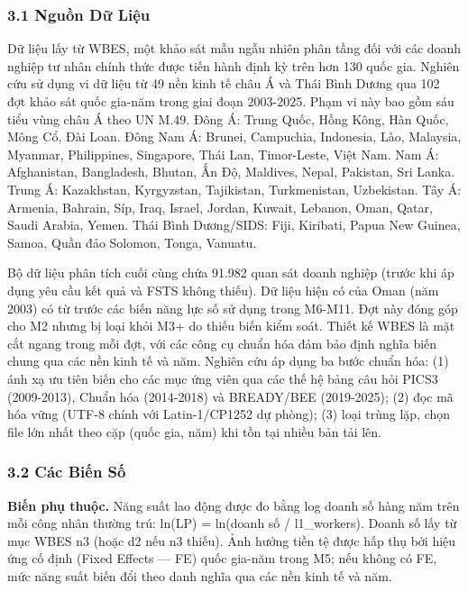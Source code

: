 \documentclass[12pt,a4paper]{article}
\begin{document}
\hypertarget{31-nguux1ed3n-dux1eef-liux1ec7u}{%
\subsubsection{3.1 Nguồn Dữ
Liệu}\label{31-nguux1ed3n-dux1eef-liux1ec7u}}

Dữ liệu lấy từ WBES, một khảo sát mẫu ngẫu nhiên phân tầng đối với các
doanh nghiệp tư nhân chính thức được tiến hành định kỳ trên hơn 130 quốc
gia. Nghiên cứu sử dụng vi dữ liệu từ 49 nền kinh tế châu Á và Thái Bình
Dương qua 102 đợt khảo sát quốc gia-năm trong giai đoạn 2003-2025. Phạm
vi này bao gồm sáu tiểu vùng châu Á theo UN M.49. Đông Á: Trung Quốc,
Hồng Kông, Hàn Quốc, Mông Cổ, Đài Loan. Đông Nam Á: Brunei, Campuchia,
Indonesia, Lào, Malaysia, Myanmar, Philippines, Singapore, Thái Lan,
Timor-Leste, Việt Nam. Nam Á: Afghanistan, Bangladesh, Bhutan, Ấn Độ,
Maldives, Nepal, Pakistan, Sri Lanka. Trung Á: Kazakhstan, Kyrgyzstan,
Tajikistan, Turkmenistan, Uzbekistan. Tây Á: Armenia, Bahrain, Síp,
Iraq, Israel, Jordan, Kuwait, Lebanon, Oman, Qatar, Saudi Arabia, Yemen.
Thái Bình Dương/SIDS: Fiji, Kiribati, Papua New Guinea, Samoa, Quần đảo
Solomon, Tonga, Vanuatu.

Bộ dữ liệu phân tích cuối cùng chứa 91.982 quan sát doanh nghiệp (trước
khi áp dụng yêu cầu kết quả và FSTS không thiếu). Dữ liệu hiện có của
Oman (năm 2003) có từ trước các biến năng lực số sử dụng trong M6-M11.
Đợt này đóng góp cho M2 nhưng bị loại khỏi M3+ do thiếu biến kiểm soát.
Thiết kế WBES là mặt cắt ngang trong mỗi đợt, với các công cụ chuẩn hóa
đảm bảo định nghĩa biến chung qua các nền kinh tế và năm. Nghiên cứu áp
dụng ba bước chuẩn hóa: (1) ánh xạ ưu tiên biến cho các mục ứng viên qua
các thế hệ bảng câu hỏi PICS3 (2009-2013), Chuẩn hóa (2014-2018) và
BREADY/BEE (2019-2025); (2) đọc mã hóa vững (UTF-8 chính với
Latin-1/CP1252 dự phòng); (3) loại trùng lặp, chọn file lớn nhất theo
cặp (quốc gia, năm) khi tồn tại nhiều bản tải lên.

\hypertarget{32-cuxe1c-biux1ebfn-sux1ed1}{%
\subsubsection{3.2 Các Biến Số}\label{32-cuxe1c-biux1ebfn-sux1ed1}}

\textbf{Biến phụ thuộc.} Năng suất lao động được đo bằng log doanh số
hàng năm trên mỗi công nhân thường trú: ln(LP) = ln(doanh số /
l1\_workers). Doanh số lấy từ mục WBES n3 (hoặc d2 nếu n3 thiếu). Ảnh
hưởng tiền tệ được hấp thụ bởi hiệu ứng cố định (Fixed Effects --- FE)
quốc gia-năm trong M5; nếu không có FE, mức năng suất biến đổi theo danh
nghĩa qua các nền kinh tế và năm.
\end{document}
